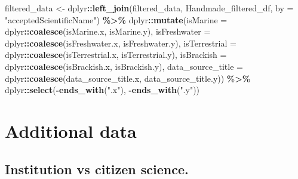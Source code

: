 \documentclass[
]{article}
\newenvironment{Shaded}{\begin{snugshade}}{\end{snugshade}}
\newcommand{\AttributeTok}[1]{\textcolor[rgb]{0.13,0.29,0.53}{#1}}
\newcommand{\FunctionTok}[1]{\textcolor[rgb]{0.13,0.29,0.53}{\textbf{#1}}}
\newcommand{\NormalTok}[1]{#1}
\newcommand{\OtherTok}[1]{\textcolor[rgb]{0.56,0.35,0.01}{#1}}
\newcommand{\SpecialCharTok}[1]{\textcolor[rgb]{0.81,0.36,0.00}{\textbf{#1}}}
\newcommand{\StringTok}[1]{\textcolor[rgb]{0.31,0.60,0.02}{#1}}
\begin{document}
\begin{Shaded}
\begin{Highlighting}[]
\NormalTok{filtered\_data }\OtherTok{\textless{}{-}}\NormalTok{ dplyr}\SpecialCharTok{::}\FunctionTok{left\_join}\NormalTok{(filtered\_data, Handmade\_filtered\_df, }\AttributeTok{by =} \StringTok{"acceptedScientificName"}\NormalTok{) }\SpecialCharTok{\%\textgreater{}\%}
\NormalTok{  dplyr}\SpecialCharTok{::}\FunctionTok{mutate}\NormalTok{(}\AttributeTok{isMarine =}\NormalTok{ dplyr}\SpecialCharTok{::}\FunctionTok{coalesce}\NormalTok{(isMarine.x, isMarine.y), }
                \AttributeTok{isFreshwater =}\NormalTok{ dplyr}\SpecialCharTok{::}\FunctionTok{coalesce}\NormalTok{(isFreshwater.x, isFreshwater.y),}
                \AttributeTok{isTerrestrial =}\NormalTok{ dplyr}\SpecialCharTok{::}\FunctionTok{coalesce}\NormalTok{(isTerrestrial.x, isTerrestrial.y),}
                \AttributeTok{isBrackish =}\NormalTok{ dplyr}\SpecialCharTok{::}\FunctionTok{coalesce}\NormalTok{(isBrackish.x, isBrackish.y),}
                \AttributeTok{data\_source\_title =}\NormalTok{ dplyr}\SpecialCharTok{::}\FunctionTok{coalesce}\NormalTok{(data\_source\_title.x, data\_source\_title.y)) }\SpecialCharTok{\%\textgreater{}\%}
\NormalTok{  dplyr}\SpecialCharTok{::}\FunctionTok{select}\NormalTok{(}\SpecialCharTok{{-}}\FunctionTok{ends\_with}\NormalTok{(}\StringTok{".x"}\NormalTok{), }\SpecialCharTok{{-}}\FunctionTok{ends\_with}\NormalTok{(}\StringTok{".y"}\NormalTok{))}
\end{Highlighting}
\end{Shaded}

\hypertarget{additional-data}{%
\section{Additional data}\label{additional-data}}

\hypertarget{institution-vs-citizen-science.}{%
\subsection{Institution vs citizen
science.}\label{institution-vs-citizen-science.}}
\end{document}
